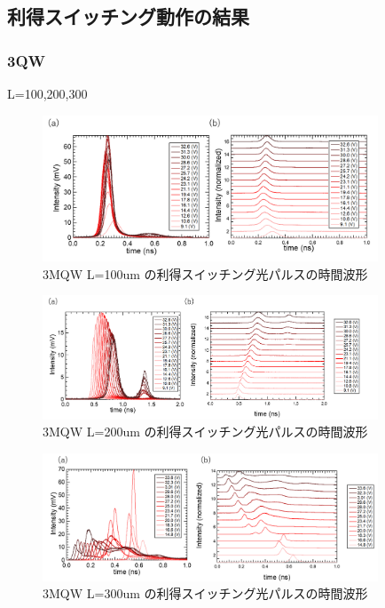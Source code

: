 \subsection{利得スイッチング動作の結果}
\subsubsection{3QW}%
L=100,200,300
\begin{figure}[h]
	\centering
	\includegraphics[width=10cm]{figure/fig_3_2_3QW_ridge_L100_GS.png}
		\caption{3MQW L=100um の利得スイッチング光パルスの時間波形}
		\label{fig:fig_3_2_3QW_ridge_L100_GS}
\end{figure}

\begin{figure}[h]
	\centering
	\includegraphics[width=10cm]{figure/fig_3_2_3QW_ridge_L200_GS.png}
		\caption{3MQW L=200um の利得スイッチング光パルスの時間波形}
		\label{fig:fig_3_2_3QW_ridge_L200_GS}
\end{figure}
\begin{figure}[h]
	\centering
	\includegraphics[width=10cm]{figure/fig_3_2_3QW_ridge_L300_GS.png}
		\caption{3MQW L=300um の利得スイッチング光パルスの時間波形}
		\label{fig:fig_3_2_3QW_ridge_L300_GS}
\end{figure}
\newpage
　　
